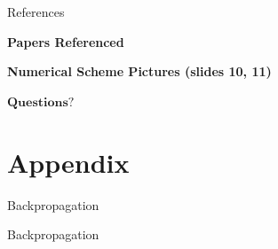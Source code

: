 \documentclass[10pt]{beamer}
\begin{document}
\begin{frame}{References}

\textbf{Papers Referenced}

\textbf{Numerical Scheme Pictures (slides 10, 11)}

\end{frame}

\begin{frame}{}
\centering
{\huge $\textbf{Questions?}$}
\end{frame}

\hypersetup{bookmarksdepth=0}
\appendix
\section{Appendix}
\begin{frame}{Backpropagation}

\end{frame}
\begin{frame}{Backpropagation}

\end{frame}
\end{document}
